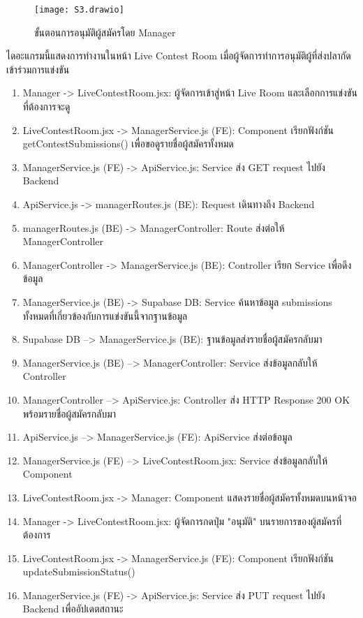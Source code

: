 \begin{figure}[h]
	\centering
	\texttt{[image: S3.drawio]}
	\caption{ขั้นตอนการอนุมัติผู้สมัครโดย Manager}
\end{figure}

\indent ไดอะแกรมนี้แสดงการทำงานในหน้า Live Contest Room เมื่อผู้จัดการทำการอนุมัติผู้ที่ส่งปลากัดเข้าร่วมการแข่งขัน

\begin{sloppypar}
	\begin{enumerate}
		\item Manager -> LiveContestRoom.jsx: ผู้จัดการเข้าสู่หน้า Live Room และเลือกการแข่งขันที่ต้องการจะดู
		\item LiveContestRoom.jsx -> ManagerService.js (FE): Component เรียกฟังก์ชัน getContestSubmissions() เพื่อขอดูรายชื่อผู้สมัครทั้งหมด
		\item ManagerService.js (FE) -> ApiService.js: Service ส่ง GET request ไปยัง Backend 
		\item ApiService.js -> managerRoutes.js (BE): Request เดินทางถึง Backend
		\item managerRoutes.js (BE) -> ManagerController: Route ส่งต่อให้ ManagerController
		\item ManagerController -> ManagerService.js (BE): Controller เรียก Service เพื่อดึงข้อมูล
		\item ManagerService.js (BE) -> Supabase DB: Service ค้นหาข้อมูล submissions ทั้งหมดที่เกี่ยวข้องกับการแข่งขันนี้จากฐานข้อมูล
		\item Supabase DB --> ManagerService.js (BE): ฐานข้อมูลส่งรายชื่อผู้สมัครกลับมา 
		\item ManagerService.js (BE) --> ManagerController: Service ส่งข้อมูลกลับให้ Controller
		\item ManagerController --> ApiService.js: Controller ส่ง HTTP Response 200 OK พร้อมรายชื่อผู้สมัครกลับมา
		\item ApiService.js --> ManagerService.js (FE): ApiService ส่งต่อข้อมูล
		\item ManagerService.js (FE) --> LiveContestRoom.jsx: Service ส่งข้อมูลกลับให้ Component
		\item LiveContestRoom.jsx -> Manager: Component แสดงรายชื่อผู้สมัครทั้งหมดบนหน้าจอ
		\item Manager -> LiveContestRoom.jsx: ผู้จัดการกดปุ่ม "อนุมัติ" บนรายการของผู้สมัครที่ต้องการ
		\item LiveContestRoom.jsx -> ManagerService.js (FE): Component เรียกฟังก์ชัน updateSubmissionStatus()
		\item ManagerService.js (FE) -> ApiService.js: Service ส่ง PUT request ไปยัง Backend เพื่ออัปเดตสถานะ

\end{enumerate}
\end{sloppypar}

